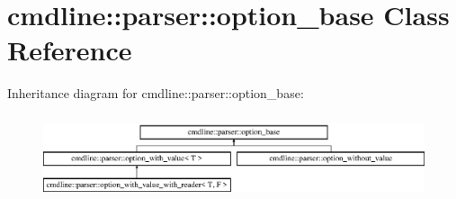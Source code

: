 \hypertarget{classcmdline_1_1parser_1_1option__base}{}\section{cmdline\+::parser\+::option\+\_\+base Class Reference}
\label{classcmdline_1_1parser_1_1option__base}
Inheritance diagram for cmdline\+::parser\+::option\+\_\+base\+:\begin{figure}[H]
\begin{center}
\leavevmode
\includegraphics[height=2.507463cm]{classcmdline_1_1parser_1_1option__base}
\end{center}
\end{figure}
